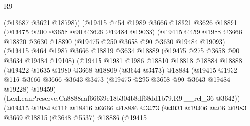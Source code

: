 \begin{lexlean}{R9}
\begin{coremodule}
                        (@18687 @3621 @18798))
                      (@19415
                        @454
                        @1989
                        @3666
                        @18821
                        @3626
                        @18891
                        (@19475 @200 @3658 @90 @3626 @19484 @19033)
                        (@19415
                          @459
                          @1988
                          @3666
                          @18820
                          @3630
                          @18890
                          (@19475 @250 @3658 @90 @3630 @19484 @19093)
                          (@19415
                            @464
                            @1987
                            @3666
                            @18819
                            @3634
                            @18889
                            (@19475 @275 @3658 @90 @3634 @19484 @19108)
                            (@19415
                              @1981
                              @1986
                              @18810
                              @18818
                              @18884
                              @18888
                              (@19422
                                @1635
                                @1980
                                @3668
                                @18809
                                (@3644 @3473)
                                @18884
                                (@19415
                                  @1932
                                  @116
                                  @3666
                                  @3666
                                  @3643
                                  @3473
                                  (@19475 @295 @3658 @90 @3643 @19484 @19228)
                                  @19459)
                                (LexLeanPreserve.Ca8888aaf66639e18b304b8df68dd1b79.R9.__rel_36
                                  @3642))
                              (@19415
                                @1984
                                @116
                                @18816
                                @3666
                                @18886
                                @3473
                                (@4031
                                  @19406
                                  @406
                                  @1983
                                  @3669
                                  @18815
                                  (@3648 @5537)
                                  @18886
                                  (@19415

\end{coremodule}
\end{lexlean}
